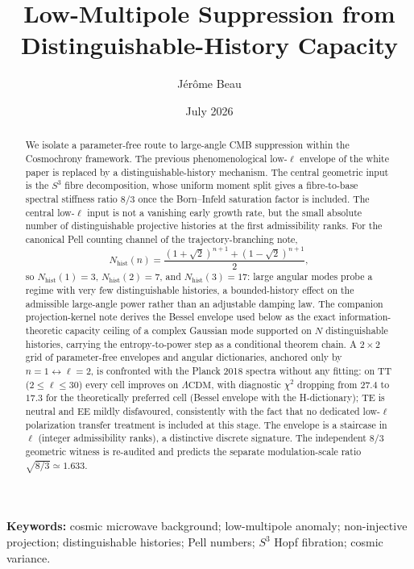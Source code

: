 \documentclass[11pt]{article}
\title{Low-Multipole Suppression from Distinguishable-History Capacity}
\author{J\'er\^ome Beau}
\date{July 2026}
\newcommand{\Nhist}{N_{\mathrm{hist}}}
\newcommand{\lcdm}{\Lambda\mathrm{CDM}}
\begin{document}
\maketitle

\begin{abstract}
We isolate a parameter-free route to large-angle CMB suppression within the Cosmochrony framework.
The previous phenomenological low-$\ell$ envelope of the white paper is replaced by a
distinguishable-history mechanism.
The central geometric input is the $S^3$ fibre decomposition, whose uniform moment split gives a
fibre-to-base spectral stiffness ratio $8/3$ once the Born--Infeld saturation factor is included.
The central low-$\ell$ input is not a vanishing early growth rate, but the small absolute number of
distinguishable projective histories at the first admissibility ranks.
For the canonical Pell counting channel of the trajectory-branching note,
\[
\Nhist(n)=\frac{(1+\sqrt{2})^{n+1}+(1-\sqrt{2})^{n+1}}{2},
\]
so $\Nhist(1)=3$, $\Nhist(2)=7$, and $\Nhist(3)=17$: large angular modes probe a regime with very
few distinguishable histories, a bounded-history effect on the admissible large-angle power rather
than an adjustable damping law.
The companion projection-kernel note derives the Bessel envelope used below as the exact
information-theoretic capacity ceiling of a complex Gaussian mode supported on $N$ distinguishable
histories, carrying the entropy-to-power step as a conditional theorem chain.
A $2\times2$ grid of parameter-free envelopes and angular dictionaries, anchored only by
$n=1\leftrightarrow\ell=2$, is confronted with the Planck 2018 spectra without any fitting:
on TT ($2\le\ell\le30$) every cell improves on $\lcdm$, with diagnostic $\chi^2$ dropping from
$27.4$ to $17.3$ for the theoretically preferred cell (Bessel envelope with the H-dictionary);
TE is neutral and EE mildly disfavoured, consistently with the fact that no dedicated low-$\ell$
polarization transfer treatment is included at this stage.
The envelope is a staircase in $\ell$ (integer admissibility ranks), a distinctive discrete
signature.
The independent $8/3$ geometric witness is re-audited and predicts the separate modulation-scale
ratio $\sqrt{8/3}\simeq1.633$.
\end{abstract}

\medskip
\noindent\textbf{Keywords:} cosmic microwave background; low-multipole anomaly; non-injective
projection; distinguishable histories; Pell numbers; $S^3$ Hopf fibration; cosmic variance.

\newpage
\tableofcontents
\end{document}
